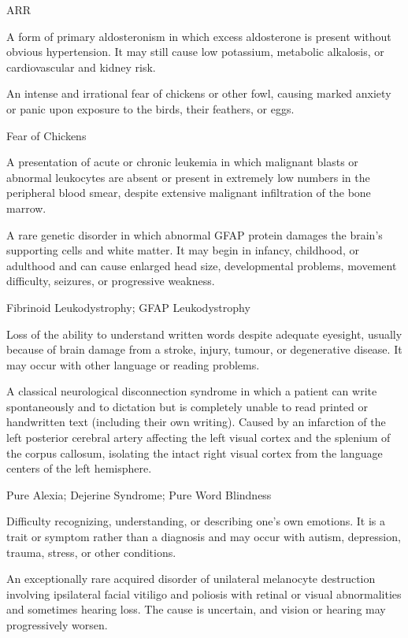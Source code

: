 \synonyms
ARR

 A form of primary aldosteronism in which excess aldosterone is present without obvious hypertension. It may still cause low potassium, metabolic alkalosis, or cardiovascular and kidney risk.

 An intense and irrational fear of chickens or other fowl, causing marked anxiety or panic upon exposure to the birds, their feathers, or eggs.

\synonyms
Fear of Chickens

 A presentation of acute or chronic leukemia in which malignant blasts or abnormal leukocytes are absent or present in extremely low numbers in the peripheral blood smear, despite extensive malignant infiltration of the bone marrow.

 A rare genetic disorder in which abnormal GFAP protein damages the brain’s supporting cells and white matter. It may begin in infancy, childhood, or adulthood and can cause enlarged head size, developmental problems, movement difficulty, seizures, or progressive weakness.

\synonyms
Fibrinoid Leukodystrophy; GFAP Leukodystrophy

 Loss of the ability to understand written words despite adequate eyesight, usually because of brain damage from a stroke, injury, tumour, or degenerative disease. It may occur with other language or reading problems.

 A classical neurological disconnection syndrome in which a patient can write spontaneously and to dictation but is completely unable to read printed or handwritten text (including their own writing). Caused by an infarction of the left posterior cerebral artery affecting the left visual cortex and the splenium of the corpus callosum, isolating the intact right visual cortex from the language centers of the left hemisphere.

\synonyms
Pure Alexia; Dejerine Syndrome; Pure Word Blindness

 Difficulty recognizing, understanding, or describing one’s own emotions. It is a trait or symptom rather than a diagnosis and may occur with autism, depression, trauma, stress, or other conditions.

 An exceptionally rare acquired disorder of unilateral melanocyte destruction involving ipsilateral facial vitiligo and poliosis with retinal or visual abnormalities and sometimes hearing loss. The cause is uncertain, and vision or hearing may progressively worsen.

